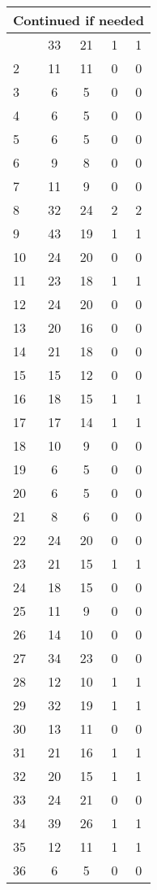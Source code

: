 \begin{center}
\begin{longtable}{l|c|c|c|c}
\hline \multicolumn{5}{|r|}{{Continued if needed}} \\ \hline
\endfoot 
1 & 33 & 21 & 1 & 1\\ \hline
2 & 11 & 11 & 0 & 0\\ \hline
3 & 6 & 5 & 0 & 0\\ \hline
4 & 6 & 5 & 0 & 0\\ \hline
5 & 6 & 5 & 0 & 0\\ \hline
6 & 9 & 8 & 0 & 0\\ \hline
7 & 11 & 9 & 0 & 0\\ \hline
8 & 32 & 24 & 2 & 2\\ \hline
9 & 43 & 19 & 1 & 1\\ \hline
10 & 24 & 20 & 0 & 0\\ \hline
11 & 23 & 18 & 1 & 1\\ \hline
12 & 24 & 20 & 0 & 0\\ \hline
13 & 20 & 16 & 0 & 0\\ \hline
14 & 21 & 18 & 0 & 0\\ \hline
15 & 15 & 12 & 0 & 0\\ \hline
16 & 18 & 15 & 1 & 1\\ \hline
17 & 17 & 14 & 1 & 1\\ \hline
18 & 10 & 9 & 0 & 0\\ \hline
19 & 6 & 5 & 0 & 0\\ \hline
20 & 6 & 5 & 0 & 0\\ \hline
21 & 8 & 6 & 0 & 0\\ \hline
22 & 24 & 20 & 0 & 0\\ \hline
23 & 21 & 15 & 1 & 1\\ \hline
24 & 18 & 15 & 0 & 0\\ \hline
25 & 11 & 9 & 0 & 0\\ \hline
26 & 14 & 10 & 0 & 0\\ \hline
27 & 34 & 23 & 0 & 0\\ \hline
28 & 12 & 10 & 1 & 1\\ \hline
29 & 32 & 19 & 1 & 1\\ \hline
30 & 13 & 11 & 0 & 0\\ \hline
31 & 21 & 16 & 1 & 1\\ \hline
32 & 20 & 15 & 1 & 1\\ \hline
33 & 24 & 21 & 0 & 0\\ \hline
34 & 39 & 26 & 1 & 1\\ \hline
35 & 12 & 11 & 1 & 1\\ \hline
36 & 6 & 5 & 0 & 0\\ \hline

\end{longtable}
\end{center}
